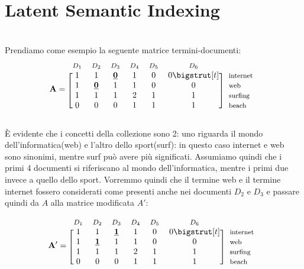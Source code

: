 \chapter{Latent Semantic Indexing}
\label{cap:latent-semantic-indexing}
\\

Prendiamo come esempio la seguente matrice termini-documenti:
\begin{equation*}
    \mathbf{A}=
    \begin{blockarray}{*{6}{c} l}
      \begin{block}{*{6}{>{$\footnotesize}c<{$}} l}
        $D_1$ & $D_2$ & $D_3$ & $D_4$ & $D_5$ & $D_6$ & \\
      \end{block}
      \begin{block}{[*{6}{c}]>{$\footnotesize}l<{$}}
        1 & 1 & \textbf{\underline{0}} & 1 & 0 & 0 \bigstrut[t]& internet \\
        1 & \textbf{\underline{0}} & 1 & 1 & 0 & 0 & web \\
        1 & 1 & 1 & 2 & 1 & 1 & surfing \\
        0 & 0 & 0 & 1 & 1 & 1 & beach \\
      \end{block}
    \end{blockarray}
  \end{equation*}

È evidente che i concetti della collezione sono 2: uno riguarda il mondo dell'informatica(web) e l'altro dello sport(surf): in questo caso internet e web sono sinonimi, mentre surf può avere più significati. Assumiamo quindi che i primi 4 documenti si riferiscano al mondo dell'informatica, mentre i primi due invece a quello dello sport. Vorremmo quindi che il termine web e il termine internet fossero considerati come presenti anche nei documenti $D_2$ e $D_3$ e passare quindi da $A$ alla matrice modificata $A'$:

  \begin{equation*}
    \mathbf{A'}=
    \begin{blockarray}{*{6}{c} l}
      \begin{block}{*{6}{>{$\footnotesize}c<{$}} l}
        $D_1$ & $D_2$ & $D_3$ & $D_4$ & $D_5$ & $D_6$ & \\
      \end{block}
      \begin{block}{[*{6}{c}]>{$\footnotesize}l<{$}}
        1 & 1 & \textbf{\underline{1}} & 1 & 0 & 0 \bigstrut[t]& internet \\
        1 & \textbf{\underline{1}} & 1 & 1 & 0 & 0 & web \\
        1 & 1 & 1 & 2 & 1 & 1 & surfing \\
        0 & 0 & 0 & 1 & 1 & 1 & beach \\
      \end{block}
    \end{blockarray}
  \end{equation*}

